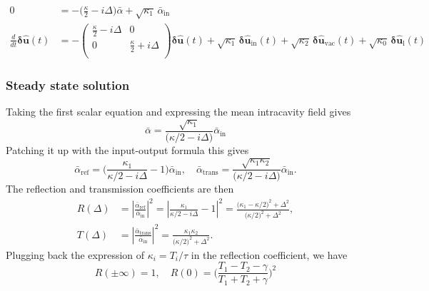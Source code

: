  \begin{equation}
  \begin{split}
  0 &= -\Big(\frac{\kappa}{2}-i\Delta\Big) \bar{\alpha} + \sqrt{\kappa_1} \, \bar{\alpha}_{\mathrm{in}} \\
  \frac{d}{dt} \mathbf{\delta \hat{u}}(t)&= - \begin{pmatrix}
  \frac{\kappa}{2}-i\Delta & 0 \\ 
   0 & \frac{\kappa}{2}+i\Delta \\ 
  \end{pmatrix}  \mathbf{\delta \hat{u}}(t) + \sqrt{\kappa_{\mathrm{1}}} \, \mathbf{\delta \hat{u}_{\mathrm{in}}}(t)  + \sqrt{\kappa_2} \, \mathbf{\delta \hat{u}_{\mathrm{vac}}}(t) + \sqrt{\kappa_0} \, \mathbf{\delta \hat{u}_{\mathrm{l}}}(t) 
  \end{split}
\end{equation}

\subsubsection{Steady state solution}
Taking the first scalar equation and expressing the mean intracavity field gives 
\begin{equation}
  \bar{\alpha} =  \frac{\sqrt{\kappa_1}}{\Big(\kappa/2-i\Delta\Big)}  \bar{\alpha}_{\mathrm{in}} 
\end{equation}
Patching it up with the input-output formula this gives 
\begin{equation}
  \bar{\alpha}_{\mathrm{ref}} =  \Bigg( \frac{\kappa_1}{\kappa/2-i\Delta} - 1 \Bigg)  \bar{\alpha}_{\mathrm{in}}  , \quad   \bar{\alpha}_{\mathrm{trans}} =  \frac{\sqrt{\kappa_1 \kappa_2}}{\Big(\kappa/2-i\Delta\Big)} \bar{\alpha}_{\mathrm{in}}.
\end{equation}
The reflection and transmission coefficients are then
\begin{align}
R(\Delta) &= \left|\frac{\bar{\alpha}_{\mathrm{ref}}}{\bar{\alpha}_{\mathrm{in}}}\right|^2
= \left| \frac{\kappa_1}{\kappa/2 - i\Delta} -1 \right|^2
= \frac{\bigl(\kappa_1-\kappa/2\bigr)^2+\Delta^2}{\bigl(\kappa/2)^2+\Delta^2},\\[10pt]
T(\Delta) &= \left|\frac{\bar{\alpha}_{\mathrm{trans}}}{\bar{\alpha}_{\mathrm{in}}}\right|^2
= \frac{\kappa_1\kappa_2}{\bigl(\kappa/2\bigr)^2+\Delta^2}.
\end{align}
Plugging back the expression of $\kappa_i = T_i/\tau$ in the reflection coefficient, we have 
\begin{equation}
  R(\pm\infty) = 1 , \quad R(0) = \Bigg(\frac{T_1 - T_2 - \gamma}{T_1 + T_2 + \gamma}\Bigg)^2
\end{equation}

